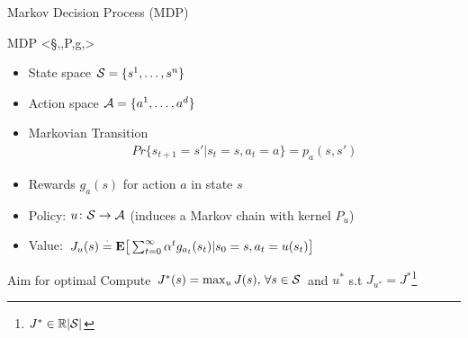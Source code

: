 \documentclass[10pt,handout]{beamer}
\begin{document}
\begin{frame}[fragile]{Markov Decision Process (MDP)}
\begin{block}{MDP <\S,\A,P,g,\alpha>}
\begin{itemize}
\item State space $\S=\{s^1,\ldots,s^n\}$
\item Action space $\A=\{a^1,\ldots,a^d\}$
\item Markovian Transition
\begin{align*}
Pr\{s_{t+1}=s'| s_t=s, a_t=a\}=p_a(s,s')
\end{align*}
\item Rewards $g_a(s)$ for action $a$ in state $s$
\item Policy: $u\colon \S\ra \A$ (induces a Markov chain with kernel $P_u$)
\item Value: $J_u(s)\eqdef \E\big[\sum_{t=0}^\infty \alpha^t g_{a_t}(s_t)|s_0=s,a_t=u(s_t)\big]$
\end{itemize}
\end{block}
\begin{block}{Aim for optimal}
Compute  $J^*(s)=\max_{u} J(s),\,\forall s\in \S$ and $u^*$ s.t $J_{u^*}=J^*$\footnote{$J^*\in \R{|\S|}$}
\end{block}
\end{frame}
\end{document}
